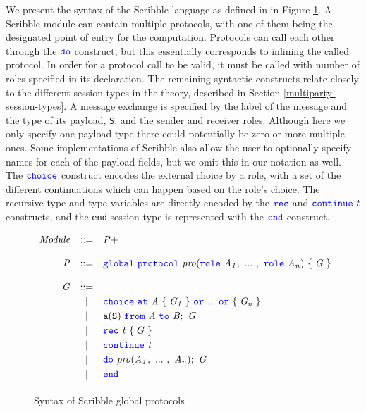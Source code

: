 \documentclass[12pt,twoside]{report}
\newcommand{\white}{\ \ \ \ \ \ \ \ \ \ \ \ }
\begin{document}
We present the syntax of the Scribble language as defined in \cite{featherweight} in Figure \ref{scribble-global-protocol}. A Scribble module can contain multiple protocols, with one of them being the designated point of entry for the computation. Protocols can call each other through the ${\color{blue}\mathtt{do}}$ construct, but this essentially corresponds to inlining the called protocol. In order for a protocol call to be valid, it must be called with number of roles specified in its declaration. The remaining syntactic constructs relate closely to the different session types in the theory, described in Section \ref{multiparty-session-types}. A message exchange is specified by the label of the message and the type of its payload, \texttt{S}, and the sender and receiver roles. Although here we only specify one payload type there could potentially be zero or more multiple ones. Some implementations of Scribble also allow the user to optionally specify names for each of the payload fields, but we omit this in our notation as well. The ${\color{blue}\mathtt{choice}}$ construct encodes the external choice by a role, with a set of the different continuations which can happen based on the role's choice. The recursive type and type variables are directly encoded by the ${\color{blue}\mathtt{rec}}$ and ${\color{blue}\mathtt{continue}}\ t$ constructs, and the \texttt{end} session type is represented with the ${\color{blue}\mathtt{end}}$ construct.\\



\begin{figure}[!h]
    \centering
    \begin{math}
        \begin{array}{rcl}
            \mathit{Module} & ::= & \mathit{P}+\\\\
            \mathit{P} & ::= & {\color{blue}\mathtt{global}}\ {\color{blue}\mathtt{protocol}}\ \mathit{pro}({\color{blue}\mathtt{role}}\ \mathit{A_1},\ ...\ ,\ {\color{blue}\mathtt{role}}\ \mathit{A_n})\ \{\;\mathit{G}\;\} \\\\
            \mathit{G} & ::= &\\[2.75pt]
              &   | & {\color{blue}\mathtt{choice}}\ {\color{blue}\mathtt{at}}\ \mathit{A}\ \{\;\mathit{G_1}\;\}\ {\color{blue}\mathtt{or}}\ ...\ {\color{blue}\mathtt{or}}\ \{\;\mathit{G_n}\;\} \\[2.75pt]
              &   | & \mathtt{a}(\mathtt{S})\ {\color{blue}\mathtt{from}}\ \mathit{A}\ {\color{blue}\mathtt{to}}\ \mathit{B};\ \mathit{G} \\[2.75pt]
              &   | & {\color{blue}\mathtt{rec}}\ \mathit{t}\ \{\;G\;\} \\[2.75pt]
              &   | &  {\color{blue}\mathtt{continue}}\ \mathit{t} \\[2.75pt]
              &   | & {\color{blue}\mathtt{do}}\ \mathit{pro}(\mathit{A_1},\ ...\ ,\ \mathit{A_n});\ \mathit{G} \\[2.75pt]
              &   | & {\color{blue}\mathtt{end}} \\[2.75pt]
        \end{array}
    \end{math}
    \caption{Syntax of Scribble global protocols}
    \label{scribble-global-protocol}
\end{figure}
\end{document}
